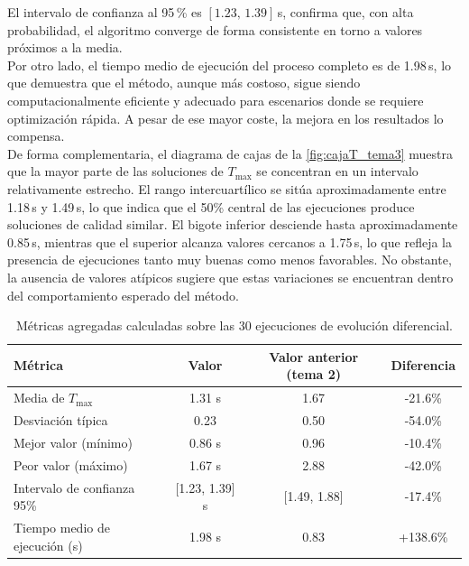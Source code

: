El intervalo de 
confianza al 95\,\% es $[1.23,\,1.39]$\,s, confirma que, con alta probabilidad, el algoritmo converge
de forma consistente en torno a valores próximos a la media. \\

Por otro lado, el tiempo medio de ejecución del proceso completo es de 1.98\,s, lo que demuestra
que el método, aunque más costoso, sigue siendo computacionalmente eficiente y adecuado para
escenarios donde se requiere optimización rápida. A pesar de ese mayor coste, la mejora en 
los resultados lo compensa.\\

De forma complementaria, el diagrama de cajas de la \autoref{fig:cajaT_tema3} 
muestra que la mayor parte de las soluciones de $T_{\max}$ se concentran en un intervalo 
relativamente estrecho. El rango intercuartílico se sitúa aproximadamente entre 1.18\,s y 1.49\,s, 
lo que indica que el 50\% central de las ejecuciones produce soluciones de calidad similar.
El bigote inferior desciende hasta aproximadamente 0.85\,s, mientras que el superior alcanza
valores cercanos a 1.75\,s, lo que refleja la presencia de ejecuciones tanto muy
buenas como menos favorables. No obstante, la ausencia de valores atípicos sugiere que
estas variaciones se encuentran dentro del comportamiento esperado del método.


\begin{table}[H]
\centering
\begin{tabular}{|l|c|c|c|}
\hline
\textbf{Métrica} & \cellcolor{yellow!30}\textbf{Valor} & \textbf{Valor anterior (tema 2)} & \textbf{Diferencia} \\
\hline
Media de $T_{\max}$ & \cellcolor{yellow!30}1.31 s & 1.67 & -21.6\% \\
Desviación típica & \cellcolor{yellow!30}0.23 & 0.50 & -54.0\% \\
Mejor valor (mínimo) & \cellcolor{yellow!30}0.86 s & 0.96 & -10.4\% \\
Peor valor (máximo) & \cellcolor{yellow!30}1.67 s & 2.88 & -42.0\% \\
Intervalo de confianza 95\% & \cellcolor{yellow!30}[1.23, 1.39] s & [1.49, 1.88] & -17.4\% \\ 
Tiempo medio de ejecución (s) & \cellcolor{yellow!30}1.98 s & 0.83 & +138.6\% \\
\hline
\end{tabular}
\caption{Métricas agregadas calculadas sobre las 30 ejecuciones de evolución diferencial.}
\label{tab:tema3_tabla2}
\end{table}

